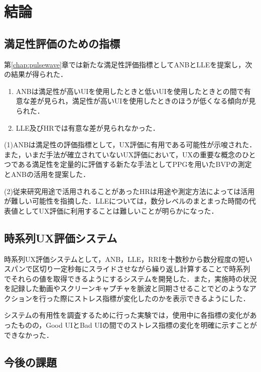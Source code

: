 \chapter{結論}
\label{chap:conclusion}

\section{満足性評価のための指標}

第\ref{chap:pulsewave}章では新たな満足性評価指標としてANBとLLEを提案し，次の結果が得られた．

\begin{enumerate}
\setlength{\parskip}{0cm}
  \setlength{\itemsep}{0cm}
  \item ANBは満足性が高いUIを使用したときと低いUIを使用したときとの間で有意な差が見られ，満足性が高いUIを使用したときのほうが低くなる傾向が見られた．
  \item LLE及びHRでは有意な差が見られなかった．
\end{enumerate}

(1)ANBは満足性の評価指標として，UX評価に有用である可能性が示唆された．また，いまだ手法が確立されていないUX評価において，UXの重要な概念のひとつである満足性を定量的に評価する新たな手法としてPPGを用いたBVPの測定とANBの活用を提案した．

(2)従来研究用途で活用されることがあったHRは用途や測定方法によっては活用が難しい可能性を指摘した．LLEについては，数分レベルのまとまった時間の代表値としてUX評価に利用することは難しいことが明らかになった．

\section{時系列UX評価システム}

時系列UX評価システムとして，ANB，LLE，RRIを十数秒から数分程度の短いスパンで区切り一定秒毎にスライドさせながら繰り返し計算することで時系列でそれらの値を取得できるようにするシステムを開発した．また，実施時の状況を記録した動画やスクリーンキャプチャを脈波と同期させることでどのようなアクションを行った際にストレス指標が変化したのかを表示できるようにした．

システムの有用性を調査するために行った実験では，使用中に各指標の変化があったものの，Good UIとBad UIの間でのストレス指標の変化を明確に示すことができなかった．

\section{今後の課題}

